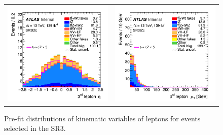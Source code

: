 \begin{figure}[!htbp]
\begin{tabular}{cc}
		\includegraphics[width=.35\textwidth]{Appendices/AP5/figures/SR3_UsingDL1rc/lep3_eta} &
		\includegraphics[width=.35\textwidth]{Appendices/AP5/figures/SR3_UsingDL1rc/lep3_pt} \\
	\end{tabular}
	\caption{Pre-fit distributions of kinematic variables of leptons for events selected in the SR3\tZc.
		\ErrStatOnly
		\Blinded
	}%
	\label{fig:sel:sr3:leps}
\end{figure}

